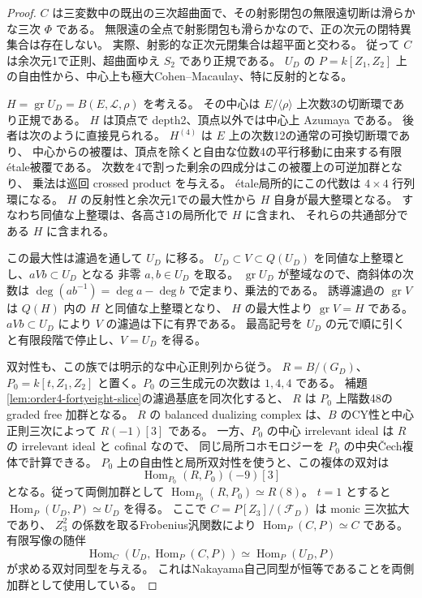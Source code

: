 \begin{proof}
$C$ は三変数中の既出の三次超曲面で、その射影閉包の無限遠切断は滑らかな三次 $\Phi$ である。
無限遠の全点で射影閉包も滑らかなので、正の次元の閉特異集合は存在しない。
実際、射影的な正次元閉集合は超平面と交わる。
従って $C$ は余次元1で正則、超曲面ゆえ $S_2$ であり正規である。
$U_D$ の $P=k[Z_1,Z_2]$ 上の自由性から、中心上も極大Cohen--Macaulay、特に反射的となる。

$H=\operatorname{gr}U_D=B(E,\mathcal L,\rho)$ を考える。
その中心は $E/\langle\rho\rangle$ 上次数3の切断環であり正規である。
$H$ は頂点で depth2、頂点以外では中心上 Azumaya である。
後者は次のように直接見られる。
$H^{(4)}$ は $E$ 上の次数12の通常の可換切断環であり、
中心からの被覆は、頂点を除くと自由な位数4の平行移動に由来する有限\'{e}tale被覆である。
次数を4で割った剰余の四成分はこの被覆上の可逆加群となり、
乗法は巡回 crossed product を与える。
\'{e}tale局所的にこの代数は $4\times4$ 行列環になる。
$H$ の反射性と余次元1での最大性から $H$ 自身が最大整環となる。
すなわち同値な上整環は、各高さ1の局所化で $H$ に含まれ、
それらの共通部分である $H$ に含まれる。

この最大性は濾過を通して $U_D$ に移る。
$U_D\subset V\subset Q(U_D)$ を同値な上整環とし、$aVb\subset U_D$ となる
非零 $a,b\in U_D$ を取る。
$\operatorname{gr}U_D$ が整域なので、商斜体の次数は
$\deg(ab^{-1})=\deg a-\deg b$ で定まり、乗法的である。
誘導濾過の $\operatorname{gr}V$ は $Q(H)$ 内の $H$ と同値な上整環となり、
$H$ の最大性より $\operatorname{gr}V=H$ である。
$aVb\subset U_D$ により $V$ の濾過は下に有界である。
最高記号を $U_D$ の元で順に引くと有限段階で停止し、$V=U_D$ を得る。

双対性も、この族では明示的な中心正則列から従う。
$R=B/(G_D)$、$P_0=k[t,Z_1,Z_2]$ と置く。$P_0$ の三生成元の次数は $1,4,4$ である。
補題\ref{lem:order4-fortyeight-slice}の濾過基底を同次化すると、
$R$ は $P_0$ 上階数48の graded free 加群となる。
$R$ の balanced dualizing complex は、$B$ のCY性と中心正則三次によって
$R(-1)[3]$ である。
一方、$P_0$ の中心 irrelevant ideal は $R$ の irrelevant ideal と cofinal なので、
同じ局所コホモロジーを $P_0$ の中央\v Cech複体で計算できる。
$P_0$ 上の自由性と局所双対性を使うと、この複体の双対は
\[
 \operatorname{Hom}_{P_0}(R,P_0)(-9)[3]
\]
となる。従って両側加群として
$\operatorname{Hom}_{P_0}(R,P_0)\simeq R(8)$。
$t=1$ とすると $\operatorname{Hom}_{P}(U_D,P)\simeq U_D$ を得る。
ここで $C=P[Z_3]/(\mathcal F_D)$ は monic 三次拡大であり、
$Z_3^2$ の係数を取るFrobenius汎関数により $\operatorname{Hom}_P(C,P)\simeq C$ である。
有限写像の随伴
\[
 \operatorname{Hom}_C(U_D,\operatorname{Hom}_P(C,P))
   \simeq\operatorname{Hom}_P(U_D,P)
\]
が求める双対同型を与える。
これはNakayama自己同型が恒等であることを両側加群として使用している。


\end{proof}
